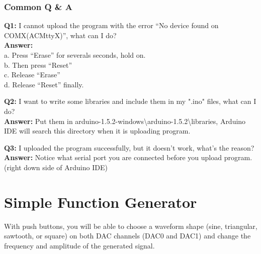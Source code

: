 \documentclass[12pt]{report}
\begin{document}
\subsection{Common Q \& A}
\textbf{Q1: }
\textup{I cannot upload the program with the error ``No device found on COMX(ACMttyX)'',  what can I do?\\}
\textbf{Answer:\\}
\textup{a. Press ``Erase'' for severals seconds, hold on.\\b. Then press ``Reset''\\c. Release ``Erase''\\d. Release ``Reset'' finally.}
\begin{flushleft}
\textbf{Q2: }
\textup{I want to write some libraries and include them in my ".ino" files, what can I do?\\}
\textbf{Answer:}
\textup{Put them in arduino-1.5.2-windows\textbackslash arduino-1.5.2\textbackslash libraries, Arduino IDE will search this directory when it is uploading program. }
\end{flushleft}
\begin{flushleft}
\textbf{Q3: }
\textup{I uploaded the program successfully, but it doesn't work, what's the reason?\\}
\textbf{Answer:}
\textup{Notice what serial port you are connected before you upload program.(right down side of Arduino IDE)}
\end{flushleft}
\newpage
\chapter{\Large Simple Function Generator}
\textup{With push buttons, you will be able to choose a waveform shape (sine, triangular, sawtooth, or square) on both DAC channels (DAC0 and DAC1) and change the frequency and amplitude of the generated signal.}
\end{document}
